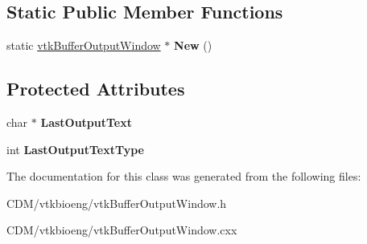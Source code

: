 \subsection*{Static Public Member Functions}
\begin{DoxyCompactItemize}
\item 
\hypertarget{classvtkBufferOutputWindow_a3621079dcfc3c7fedfe31de910a1e835}{
static \hyperlink{classvtkBufferOutputWindow}{vtkBufferOutputWindow} $\ast$ {\bfseries New} ()}
\label{classvtkBufferOutputWindow_a3621079dcfc3c7fedfe31de910a1e835}

\end{DoxyCompactItemize}
\subsection*{Protected Attributes}
\begin{DoxyCompactItemize}
\item 
\hypertarget{classvtkBufferOutputWindow_a01629d3f43521add17b3339eabe2a778}{
char $\ast$ {\bfseries LastOutputText}}
\label{classvtkBufferOutputWindow_a01629d3f43521add17b3339eabe2a778}

\item 
\hypertarget{classvtkBufferOutputWindow_abcfd0c7361f9eb2f37deb68e7d9b7d05}{
int {\bfseries LastOutputTextType}}
\label{classvtkBufferOutputWindow_abcfd0c7361f9eb2f37deb68e7d9b7d05}

\end{DoxyCompactItemize}


The documentation for this class was generated from the following files:\begin{DoxyCompactItemize}
\item 
CDM/vtkbioeng/vtkBufferOutputWindow.h\item 
CDM/vtkbioeng/vtkBufferOutputWindow.cxx\end{DoxyCompactItemize}
